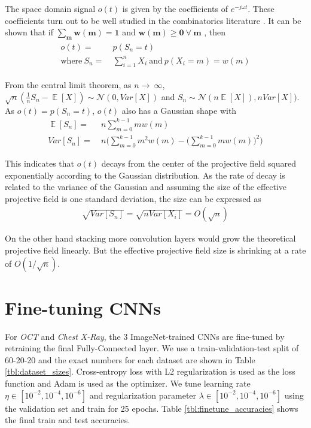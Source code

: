 The space domain signal $o(t)$ is given by the coefficients of $e^{-j\omega t}$.
These coefficients turn out to be well studied in the combinatorics literature \cite{eger2013restricted}.
It can be shown that if $\mathbf{\sum_{m}w(m) = 1}$  and $\mathbf{w(m) \geq 0 ~\forall~ m}$ , then
\begin{align}
\begin{split}
	o(t) =&~ p(S_n=t)\\ 
	\text{where}~ S_n =&~ \sum_{i=1}^{n} X_i ~\text{and}~p(X_i=m) = w(m)
\end{split}
\end{align}

From the central limit theorem, as $n \rightarrow~\infty$, $\sqrt{n}(\frac{1}{n}S_n - \mathop{\mathbb{E}}[X]) \sim \mathcal{N}(0, Var[X])$ and $S_n \sim \mathcal{N}(n\mathop{\mathbb{E}}[X]), nVar[X])$.
As $o(t) = p(S_n=t)$, $o(t)$ also has a Gaussian shape with
\begin{align}
	\mathop{\mathbb{E}}[S_n] =&~ n\sum_{m=0}^{k-1}mw(m)\\
	Var[S_n] =&~ n \Bigg(\sum_{m=0}^{k-1}m^2w(m) - \Big(\sum_{m=0}^{k-1}mw(m)\Big)^2 \Bigg)
\end{align}

This indicates that $o(t)$ decays from the center of the projective field squared exponentially according to the Gaussian distribution.
As the rate of decay is related to the variance of the Gaussian and assuming the size of the effective projective field is one standard deviation, the size can be expressed as
\begin{align}
	\sqrt{Var[S_n]} = \sqrt{nVar[X_i]} = O(\sqrt{n})
\end{align}

On the other hand stacking more convolution layers would grow the theoretical projective field linearly. But the effective projective field size is shrinking at a rate of $O(1/\sqrt{n})$.


\section{Fine-tuning CNNs}

For \textit{OCT} and \textit{Chest X-Ray}, the 3 ImageNet-trained CNNs are fine-tuned by retraining the final Fully-Connected layer.
We use a train-validation-test split of 60-20-20 and the exact numbers for each dataset are shown in Table \ref{tbl:dataset_sizes}.
Cross-entropy loss with L2 regularization is used as the loss function and  Adam \cite{kingma2014adam} is used as the optimizer.
We tune learning rate $\eta \in [10^{-2}, 10^{-4}, 10^{-6}]$ and regularization parameter $\lambda \in [10^{-2}, 10^{-4}, 10^{-6}]$ using the validation set and train for 25 epochs.
Table \ref{tbl:finetune_accuracies} shows the final train and test accuracies.


